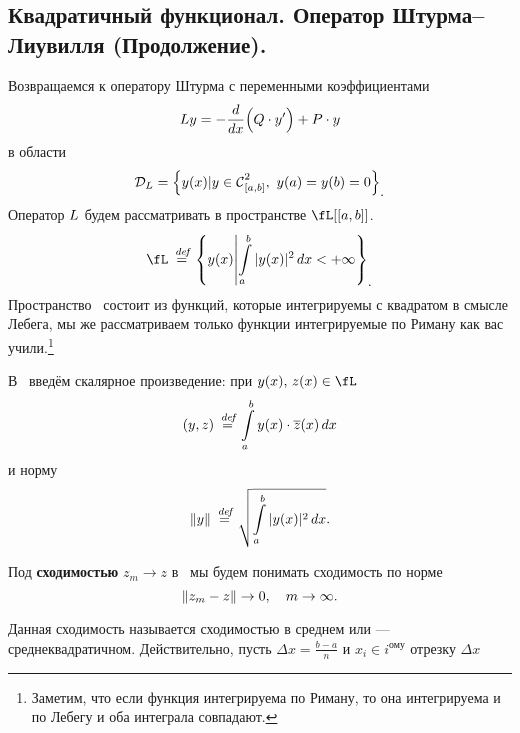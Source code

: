 	\chapter{}
\label{lecture5}
\section[Квадратичный функционал. Оператор Штурма (Продолжение). ]{Квадратичный функционал. Оператор Штурма--Лиувилля (Продолжение).}
\label{lecture5section1}
Возвращаемся к оператору Штурма с переменными коэффициентами
\begin{equation}
	\label{l5:eq:1}
	\hfill \LL{}y=-\der{}{x}\Big(Q\cdot y'\Big)+P\cdot y\hfill
\end{equation}
в области 
\begin{equation*}
	\hfill\mc{D}_{\LL}=\left\{y(x)|y\in\Cfn[{[a,b]}]{2},\ y(a)=y(b)=0\right\}_{\displaystyle.}\hfill
\end{equation*}
Оператор $L$ будем рассматривать в пространстве $\fL[{[a,b]}]$.
\begin{equation*}
	\hfill \fL\eqdef\left\{y(x)\middle|\int\limits_a^b|y(x)|^2\,dx<+\infty\right\}_{\displaystyle.}\hfill
\end{equation*}
Пространство \fL\ состоит из функций, которые интегрируемы с квадратом в смысле Лебега, мы же рассматриваем только функции интегрируемые по Риману как вас учили.\footnote[1]{Заметим, что если функция интегрируема по Риману, то она интегрируема и по Лебегу и оба интеграла совпадают.}

В \fL\ введём скалярное произведение: при $y(x),\,z(x)\in\fL$
\begin{equation*}
	\hfill(y,z)\eqdef\int\limits_a^b y(x)\cdot \overline{z}(x)\,dx\hfill
\end{equation*}  
и норму
\begin{equation*}
	\hfill\norm{y}\eqdef\sqrt{\int\limits_a^b|y(x)|^2\,dx}.\hfill
\end{equation*}
\begin{_def}
	Под \textbf{сходимостью} $z_{m}\to z$ в \fL\ мы будем понимать сходимость по норме
	\begin{equation*}
		\hfill\norm{z_m-z}\to0,\quad m\to\infty.\hfill
	\end{equation*}
\end{_def}

Данная сходимость называется сходимостью в среднем или --- среднеквадратичном. Действительно, пусть $\Delta x=\frac{b-a}{n}$ и $x_i\in i^{\text{ому}}$ отрезку $\Delta x$
\vspace{0,2cm}

